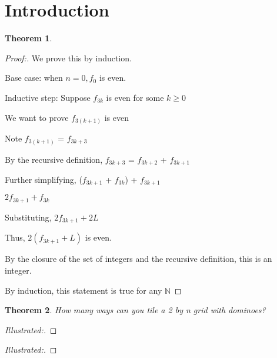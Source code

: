 \documentclass[12pt]{article}
\newtheorem{theorem}{Theorem}[section]
\begin{document}
\section{Introduction}


\begin{theorem}
    
\end{theorem}

\begin{proof}[Proof:]
    We prove this by induction.

    Base case: when $n = 0, f_0$ is even.

    Inductive step: Suppose $f_{3k}$ is even for some $k \geq 0$

    We want to prove $f_{3(k+1)}$ is even

    Note $f_{3(k+1)}$ = $f_{3k+3}$

    By the recursive definition, $f_{3k+3}$ = $f_{3k+2}$ + $f_{3k+1}$

    Further simplifying, ($f_{3k+1}$ + $f_{3k}$) + $f_{3k+1}$

    $2f_{3k+1} + f_{3k}$

    Substituting, $2f_{3k+1} + 2L$

    Thus, $2(f_{3k+1} + L)$ is even.

    By the closure of the set of integers and the recursive definition, this is an integer.

    By induction, this statement is true for any $\mathbb{N}$ 
\end{proof}

\newpage

\begin{theorem}
    How many ways can you tile a 2 by n grid with dominoes?
\end{theorem}

\begin{proof}[Illustrated:]

\end{proof}

\begin{proof}[Illustrated:]

\end{proof}

\newpage
\end{document}
